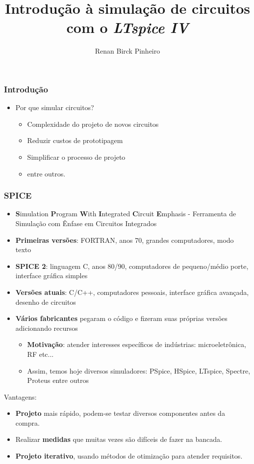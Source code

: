 \documentclass{beamer}
\title{Introdução à simulação de circuitos com o \textit{LTspice IV}}
\author{Renan Birck Pinheiro}
\institute{Universidade Federal de Santa Maria}
\begin{document}
\begin{frame}
\titlepage
\end{frame}

\begin{frame} %
\frametitle{Introdução}
\begin{itemize}
\item{Por que simular circuitos?}
\begin{itemize}
\pause
\item{Complexidade do projeto de novos circuitos}
\pause
\item{Reduzir custos de prototipagem}
\pause
\item{Simplificar o processo de projeto}
\pause
\item{entre outros.}
\end{itemize}
\end{itemize}
\end{frame} %

\begin{frame} %
\frametitle{SPICE}
\begin{itemize}
\item{\textbf{S}imulation \textbf{P}rogram \textbf{W}ith \textbf{I}ntegrated \textbf{C}ircuit \textbf{E}mphasis - Ferramenta de Simulação com Ênfase em Circuitos Integrados}
\item{\textbf{Primeiras versões}: FORTRAN, anos 70, grandes computadores, modo texto}
\item{\textbf{SPICE 2}: linguagem C, anos 80/90, computadores de pequeno/médio porte, interface gráfica simples}
\item{\textbf{Versões atuais}: C/C++, computadores pessoais, interface gráfica avançada, desenho de circuitos}
\pause
\item{\textbf{Vários fabricantes} pegaram o código e fizeram suas próprias versões adicionando recursos}
\begin{itemize}
\item{\textbf{Motivação}: atender interesses específicos de indústrias: microeletrônica, RF etc...}
\item{Assim, temos hoje diversos simuladores: PSpice, HSpice, LTspice, Spectre, Proteus entre outros}
\end{itemize}
\end{itemize}
\end{frame} %

\begin{frame}
Vantagens:
\begin{itemize}
\item{\textbf{Projeto}} mais rápido, podem-se testar diversos componentes antes da compra.
\item{Realizar \textbf{medidas}} que muitas vezes são difíceis de fazer na bancada.
\item{\textbf{Projeto iterativo}}, usando métodos de otimização para atender requisitos.
\end{itemize}

\end{frame}
\end{document}
